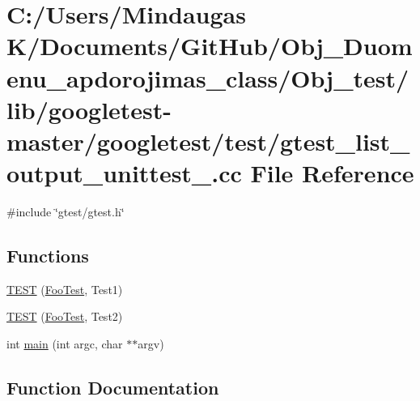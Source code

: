 \hypertarget{_obj__test_2lib_2googletest-master_2googletest_2test_2gtest__list__output__unittest___8cc}{}\section{C\+:/\+Users/\+Mindaugas K/\+Documents/\+Git\+Hub/\+Obj\+\_\+\+Duomenu\+\_\+apdorojimas\+\_\+class/\+Obj\+\_\+test/lib/googletest-\/master/googletest/test/gtest\+\_\+list\+\_\+output\+\_\+unittest\+\_\+.cc File Reference}
\label{_obj__test_2lib_2googletest-master_2googletest_2test_2gtest__list__output__unittest___8cc}
{\ttfamily \#include \char`\"{}gtest/gtest.\+h\char`\"{}}\newline
\subsection*{Functions}
\begin{DoxyCompactItemize}
\item 
\mbox{\hyperlink{_obj__test_2lib_2googletest-master_2googletest_2test_2gtest__list__output__unittest___8cc_a0a40c4ec107fc667a7d9e343c956e2ea}{T\+E\+ST}} (\mbox{\hyperlink{class_foo_test}{Foo\+Test}}, Test1)
\item 
\mbox{\hyperlink{_obj__test_2lib_2googletest-master_2googletest_2test_2gtest__list__output__unittest___8cc_a82ffa2009a6d021453fda5b2523eddb7}{T\+E\+ST}} (\mbox{\hyperlink{class_foo_test}{Foo\+Test}}, Test2)
\item 
int \mbox{\hyperlink{_obj__test_2lib_2googletest-master_2googletest_2test_2gtest__list__output__unittest___8cc_a3c04138a5bfe5d72780bb7e82a18e627}{main}} (int argc, char $\ast$$\ast$argv)
\end{DoxyCompactItemize}


\subsection{Function Documentation}
\mbox{\label{_obj__test_2lib_2googletest-master_2googletest_2test_2gtest__list__output__unittest___8cc_a3c04138a5bfe5d72780bb7e82a18e627}} 
